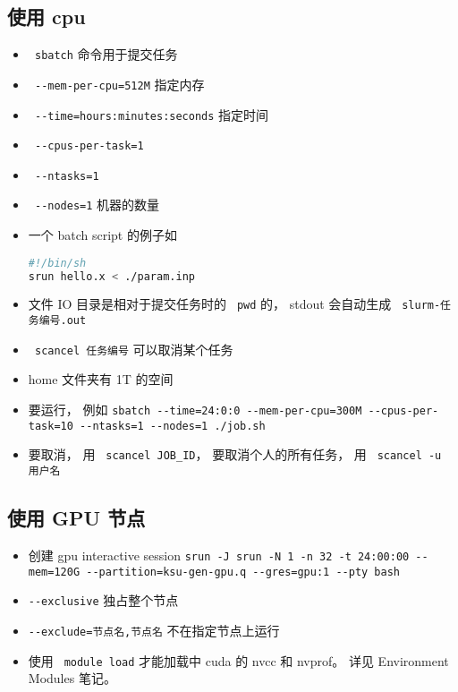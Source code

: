 
\begin{issues}
\issueDraft
\end{issues}

\subsection{使用 cpu}
\begin{itemize}
\item \verb` sbatch` 命令用于提交任务
\item \verb` --mem-per-cpu=512M` 指定内存
\item \verb` --time=hours:minutes:seconds` 指定时间
\item \verb` --cpus-per-task=1`
\item \verb` --ntasks=1`
\item \verb` --nodes=1` 机器的数量
\item 一个 batch script 的例子如
\begin{lstlisting}[language=bash]
#!/bin/sh
srun hello.x < ./param.inp
\end{lstlisting}
\item 文件 IO 目录是相对于提交任务时的 \verb` pwd` 的， stdout 会自动生成 \verb` slurm-任务编号.out`
\item \verb` scancel 任务编号` 可以取消某个任务
\item home 文件夹有 1T 的空间
\item 要运行， 例如
\verb|sbatch --time=24:0:0 --mem-per-cpu=300M --cpus-per-task=10 --ntasks=1 --nodes=1 ./job.sh|
\item 要取消， 用 \verb` scancel JOB_ID`， 要取消个人的所有任务， 用 \verb` scancel -u 用户名`
\end{itemize}

\subsection{使用 GPU 节点}
\begin{itemize}
\item 创建 gpu interactive session \verb|srun -J srun -N 1 -n 32 -t 24:00:00 --mem=120G --partition=ksu-gen-gpu.q --gres=gpu:1 --pty bash|
\item \verb`--exclusive` 独占整个节点
\item \verb`--exclude=节点名,节点名` 不在指定节点上运行
\item 使用 \verb` module load` 才能加载中 cuda 的 nvcc 和 nvprof。 详见 Environment Modules 笔记。
\end{itemize}

